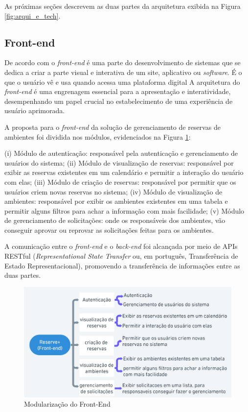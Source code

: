 \documentclass[12pt]{article}
\begin{document}
As próximas seções descrevem as duas partes da arquitetura exibida na Figura \ref{fig:arqui_e_tech}.

\subsection{Front-end} \label{sec:front_end}

De acordo com \cite{kriger} o \textit{front-end} é uma parte do desenvolvimento de sistemas que se dedica a criar a parte visual e interativa de um site, aplicativo ou \textit{software}. É o que o usuário vê e usa quando acessa uma plataforma digital A arquitetura do \textit{front-end} é uma engrenagem essencial para a apresentação e interatividade, desempenhando um papel crucial no estabelecimento de uma experiência de usuário aprimorada.

A proposta para o \textit{front-end} da solução de gerenciamento de reservas de ambientes foi dividida nos módulos, evidenciados na Figura \ref{fig:front_end}:

(i) Módulo de autenticação: responsável pela autenticação e gerenciamento de usuários do sistema;
(ii) Módulo de visualização de reservas: responsável por exibir as reservas existentes em um calendário e permitir a interação do usuário com elas; (iii) Módulo de criação de reservas: responsável por permitir que os usuários criem novas reservas no sistema; (iv) Módulo de visualização de ambientes: responsável por exibir os ambientes existentes em uma tabela e permitir alguns filtros para achar a informação com mais facilidade; (v) Módulo de gerenciamento de solicitações: onde os responsáveis dos ambientes, vão conseguir aprovar ou reprovar as solicitações feitas para os ambientes.

A comunicação entre o \textit{front-end} e o \textit{back-end} foi alcançada por meio de APIs RESTful (\textit{Representational State Transfer} ou, em português, Transferência de Estado Representacional), promovendo a transferência de informações entre as duas partes.

\begin{figure}[ht]
\centering
\includegraphics[width=1.0\textwidth]{front_end.jpg}
\caption{Modularização do Front-End}
\label{fig:front_end}
\end{figure}
\end{document}
